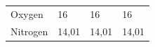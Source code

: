 {{\begin{center}
\begin{tabular}[t]{|l|l|l|l|}
    
        Oxygen &
    
    
        16 &
    
    
        16 &
    
    
        16%
     \tabularnewline\cline{1-1}\cline{2-2}\cline{3-3}\cline{4-4}
    
    
        Nitrogen &
    
    
        14,01 &
    
    
        14,01 &
    
    
        14,01%
     \tabularnewline\cline{1-1}\cline{2-2}\cline{3-3}\cline{4-4}
    

\end{tabular}
\end{center}}}
